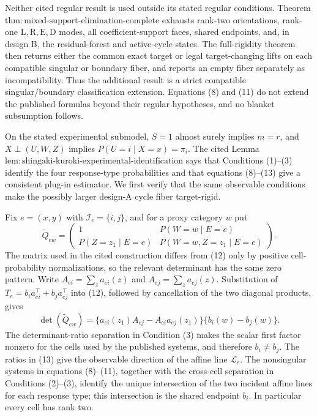 Neither cited regular result is used outside its stated regular conditions.  Theorem \(\mathrm{thm{:}mixed\text{-}support\text{-}elimination\text{-}complete}\) exhausts rank-two orientations, rank-one \(\mathrm L,\mathrm R,\mathrm E,\mathrm D\) modes, all coefficient-support faces, shared endpoints, and, in design B, the residual-forest and active-cycle states.  The full-rigidity theorem then returns either the common exact target or legal target-changing lifts on each compatible singular or boundary fiber, and reports an empty fiber separately as incompatibility.  Thus the additional result is a strict compatible singular/boundary classification extension.  Equations (8) and (11) do not extend the published formulas beyond their regular hypotheses, and no blanket subsumption follows.

On the stated experimental submodel, \(S=1\) almost surely implies \(m=r\), and \(X\perp(U,W,Z)\) implies \(P(U=i\mid X=x)=\pi_i\).  The cited Lemma \(\mathrm{lem{:}shingaki\text{-}kuroki\text{-}experimental\text{-}identification}\) says that Conditions (1)--(3) identify the four response-type probabilities and that equations (8)--(13) give a consistent plug-in estimator.  We first verify that the same observable conditions make the possibly larger design-A cycle fiber target-rigid.

Fix \(e=(x,y)\) with \(\mathcal I_e=\{i,j\}\), and for a proxy category \(w\) put
\[
 \widetilde Q_{ew}=
 \begin{pmatrix}
  1&P(W=w\mid E=e)\\
  P(Z=z_1\mid E=e)&P(W=w,Z=z_1\mid E=e)
 \end{pmatrix}.                                            \tag{12}
\]
The matrix used in the cited construction differs from (12) only by positive cell-probability normalizations, so the relevant determinant has the same zero pattern.  Write
\(A_{ei}=\sum_z a_{ei}(z)\) and \(A_{ej}=\sum_z a_{ej}(z)\).  Substitution of
\(T_e=b_i a_{ei}^{\top}+b_j a_{ej}^{\top}\) into (12), followed by cancellation of the two diagonal products, gives
\[
 \det(\widetilde Q_{ew})
 =\{a_{ei}(z_1)A_{ej}-A_{ei}a_{ej}(z_1)\}
   \{b_i(w)-b_j(w)\}.                                     \tag{13}
\]
The determinant-ratio separation in Condition (3) makes the scalar first factor nonzero for the cells used by the published systems, and therefore \(b_i\ne b_j\).  The ratios in (13) give the observable direction of the affine line \(\mathcal L_e\).  The nonsingular systems in equations (8)--(11), together with the cross-cell separation in Conditions (2)--(3), identify the unique intersection of the two incident affine lines for each response type; this intersection is the shared endpoint \(b_i\).  In particular every cell has rank two.

